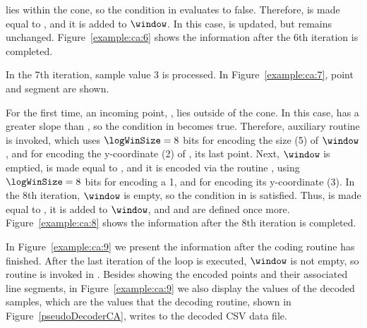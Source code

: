  lies within the cone, so the condition in  evaluates to false. Therefore, \snapshot is made equal to , and it is added to $\window$. In this case, \smin is updated, but \smax remains unchanged. Figure~\ref{example:ca:6} shows the information after the 6th iteration is completed.


\vspace{+5pt}


\clearpage

In the 7th iteration, sample value 3 is processed. In Figure~\ref{example:ca:7}, point  and segment  are shown.




For the first time, an incoming point, , lies outside of the cone. In this case,  has a greater slope than \smax, so the condition in  becomes true. Therefore, auxiliary routine \CAWinEnd is invoked, which uses $\logWinSize = 8$ bits for encoding the size (5) of $\window$, and \tobitexp for encoding the y-coordinate (2) of \snapshot, its last point. Next, $\window$ is emptied, \archived is made equal to , and it is encoded via the routine \CAWinStart, using $\logWinSize =8$ bits for encoding a 1, and \tobitexp for encoding its y-coordinate (3). In the 8th iteration, $\window$ is empty, so the condition in  is satisfied. Thus, \snapshot is made equal to , it is added to $\window$, and \smin and \smax are defined once more. Figure~\ref{example:ca:8} shows the information after the 8th iteration is completed.


\vspace{+5pt}


\clearpage


In Figure~\ref{example:ca:9} we present the information after the coding routine has finished. After the last iteration of the loop is executed, $\window$ is not empty, so routine \CAWinEnd is invoked in . Besides showing the encoded points and their associated line segments, in Figure~\ref{example:ca:9} we also display the values of the decoded samples, which are the values that the decoding routine, shown in Figure~\ref{pseudoDecoderCA}, writes to the decoded CSV data file. 



